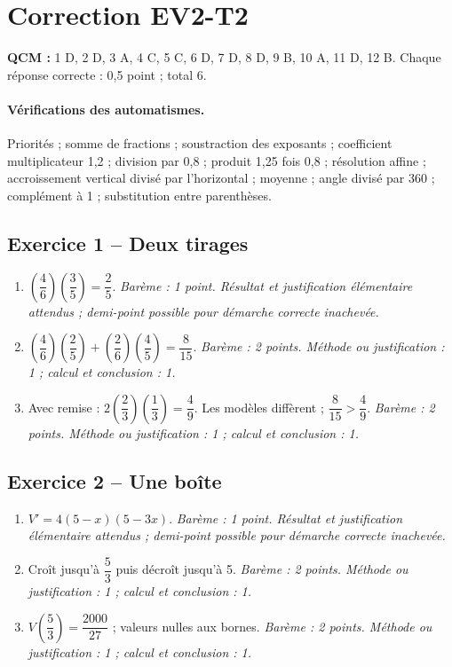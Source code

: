 \clearpage\section*{Correction EV2-T2}\label{EV2-T2-CORR}
\textbf{QCM :} 1 D, 2 D, 3 A, 4 C, 5 C, 6 D, 7 D, 8 D, 9 B, 10 A, 11 D, 12 B. Chaque réponse correcte : 0,5 point ; total 6.
\paragraph{Vérifications des automatismes.} Priorités ; somme de fractions ; soustraction des exposants ; coefficient multiplicateur 1,2 ; division par 0,8 ; produit 1,25 fois 0,8 ; résolution affine ; accroissement vertical divisé par l’horizontal ; moyenne ; angle divisé par 360 ; complément à 1 ; substitution entre parenthèses.
\subsection*{Exercice 1 -- Deux tirages}
\begin{enumerate}
\item $(\dfrac{4}{6})(\dfrac{3}{5})=\dfrac{2}{5}$. \textit{Barème : 1 point. Résultat et justification élémentaire attendus ; demi-point possible pour démarche correcte inachevée.}
\item $(\dfrac{4}{6})(\dfrac{2}{5})+(\dfrac{2}{6})(\dfrac{4}{5})=\dfrac{8}{15}$. \textit{Barème : 2 points. Méthode ou justification : 1 ; calcul et conclusion : 1.}
\item Avec remise : $2(\dfrac{2}{3})(\dfrac{1}{3})=\dfrac{4}{9}$. Les modèles diffèrent ; $\dfrac{8}{15}>\dfrac{4}{9}$. \textit{Barème : 2 points. Méthode ou justification : 1 ; calcul et conclusion : 1.}
\end{enumerate}
\subsection*{Exercice 2 -- Une boîte}
\begin{enumerate}
\item $V\prime=4(5-x)(5-3x)$. \textit{Barème : 1 point. Résultat et justification élémentaire attendus ; demi-point possible pour démarche correcte inachevée.}
\item Croît jusqu’à $\dfrac{5}{3}$ puis décroît jusqu’à 5. \textit{Barème : 2 points. Méthode ou justification : 1 ; calcul et conclusion : 1.}
\item $V(\dfrac{5}{3})=\dfrac{2000}{27}$ ; valeurs nulles aux bornes. \textit{Barème : 2 points. Méthode ou justification : 1 ; calcul et conclusion : 1.}
\end{enumerate}
